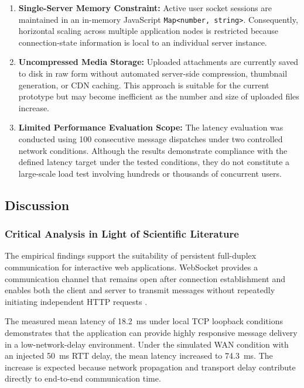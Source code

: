 \documentclass[12pt, a4paper]{article}
\begin{document}
\begin{enumerate}

    \item
    \textbf{Single-Server Memory Constraint:}
    Active user socket sessions are maintained in an in-memory JavaScript \texttt{Map<number, string>}. Consequently, horizontal scaling across multiple application nodes is restricted because connection-state information is local to an individual server instance.

    \item
    \textbf{Uncompressed Media Storage:}
    Uploaded attachments are currently saved to disk in raw form without automated server-side compression, thumbnail generation, or CDN caching. This approach is suitable for the current prototype but may become inefficient as the number and size of uploaded files increase.

    \item
    \textbf{Limited Performance Evaluation Scope:}
    The latency evaluation was conducted using 100 consecutive message dispatches under two controlled network conditions. Although the results demonstrate compliance with the defined latency target under the tested conditions, they do not constitute a large-scale load test involving hundreds or thousands of concurrent users.

\end{enumerate}

\subsection{Discussion}

\subsubsection{Critical Analysis in Light of Scientific Literature}

The empirical findings support the suitability of persistent full-duplex communication for interactive web applications. WebSocket provides a communication channel that remains open after connection establishment and enables both the client and server to transmit messages without repeatedly initiating independent HTTP requests \cite{rfc6455}.

The measured mean latency of 18.2~ms under local TCP loopback conditions demonstrates that the application can provide highly responsive message delivery in a low-network-delay environment. Under the simulated WAN condition with an injected 50~ms RTT delay, the mean latency increased to 74.3~ms. The increase is expected because network propagation and transport delay contribute directly to end-to-end communication time.
\end{document}
